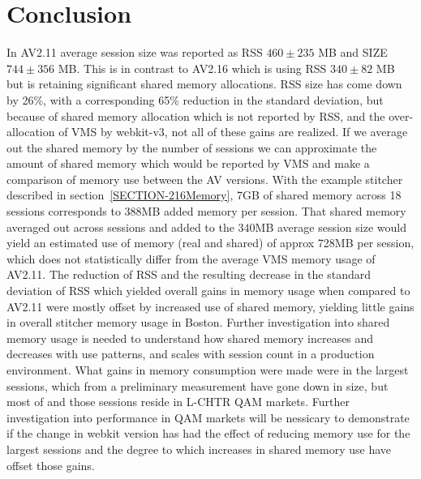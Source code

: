 \documentclass{article}
\begin{document}
\section{Conclusion}
\label{SECTION-Conclusion}

In AV2.11 average session size was reported as RSS $460 \pm 235$ MB and SIZE $744 \pm 356$ MB. This is in contrast to AV2.16 which is using RSS $340 \pm 82$ MB but is retaining significant shared memory allocations. RSS size has come down by 26\%, with a corresponding 65\% reduction in the standard deviation, but because of shared memory allocation which is not reported by RSS, and the over-allocation of VMS by webkit-v3, not all of these gains are realized. If we average out the shared memory by the number of sessions we can approximate the amount of shared memory which would be reported by VMS and make a comparison of memory use between the AV versions. With the example stitcher described in section~\ref{SECTION-216Memory}, 7GB of shared memory across 18 sessions corresponds to 388MB added memory per session. That shared memory averaged out across sessions and added to the 340MB average session size would yield an estimated use of memory (real and shared) of approx 728MB per session, which does not statistically differ from the average VMS memory usage of AV2.11. The reduction of RSS and the resulting decrease in the standard deviation of RSS which yielded overall gains in memory usage when compared to AV2.11 were mostly offset by increased use of shared memory, yielding little gains in overall stitcher memory usage in Boston. Further investigation into shared memory usage is needed to understand how shared memory increases and decreases with use patterns, and scales with session count in a production environment. What gains in memory consumption were made were in the largest sessions, which from a preliminary measurement have gone down in size, but most of and those sessions reside in L-CHTR QAM markets. Further investigation into performance in QAM markets will be nessicary to demonstrate if the change in webkit version has had the effect of reducing memory use for the largest sessions and the degree to which increases in shared memory use have offset those gains. 
\end{document}
